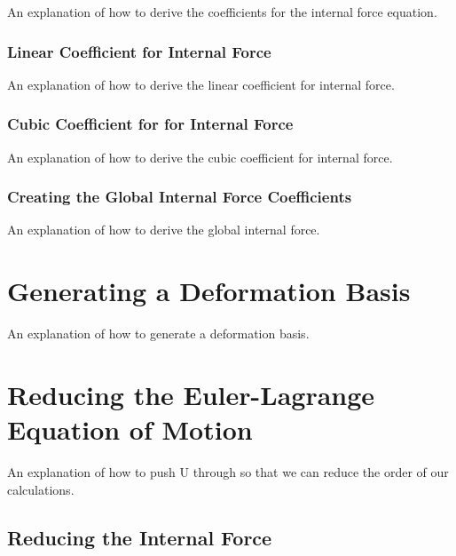\documentclass[twocolumn,10pt]{asme2ej}
\begin{document}
An explanation of how to derive the coefficients for the internal force equation.

\subsubsection{Linear Coefficient for Internal Force}

An explanation of how to derive the linear coefficient for internal force.

\subsubsection{Cubic Coefficient for for Internal Force}

An explanation of how to derive the cubic coefficient for internal force.

\subsubsection{Creating the Global Internal Force Coefficients}

An explanation of how to derive the global internal force.

\section{Generating a Deformation Basis}

An explanation of how to generate a deformation basis.

\section{Reducing the Euler-Lagrange Equation of Motion}

An explanation of how to push U through so that we can reduce the order of our calculations.

\subsection{Reducing the Internal Force}
\end{document}
